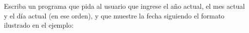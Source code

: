 \documentclass[12pt,spanish,a5paper,landscape]{article}
\begin{document}
  Escriba un programa que pida al usuario que ingrese
  el año actual, el mes actual y el día actual (en ese orden),
  y que muestre la fecha siguiendo el formato
  ilustrado en el ejemplo:

  \begin{minipage}[t]{.5\textwidth}
    
  \end{minipage}
\end{document}
